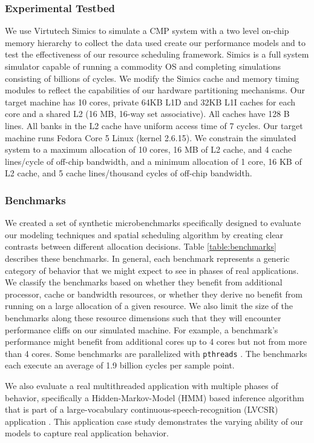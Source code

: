 \subsubsection*{Experimental Testbed}
We use Virtutech Simics \cite{simics} to simulate a CMP system with a two level on-chip memory hierarchy to collect the data used create our performance models and to test the effectiveness of our resource scheduling framework.  Simics is a full system simulator capable of running a commodity OS and completing simulations consisting of billions of cycles. We modify the Simics cache and memory timing modules to reflect the capabilities of our hardware partitioning mechanisms.  Our target machine has 10 cores, private 64KB L1D and 32KB L1I caches for each core and a shared L2 (16 MB, 16-way set associative).  All caches have 128 B lines.   All banks in the L2 cache have uniform access time of 7 cycles.  Our target machine runs Fedora Core 5 Linux (kernel 2.6.15). We constrain the simulated system to a maximum allocation of 10 cores, 16 MB of L2 cache, and 4 cache lines/cycle of off-chip bandwidth, and a minimum allocation of 1 core, 16 KB of L2 cache, and 5 cache lines/thousand cycles of off-chip bandwidth. 

\subsubsection*{Benchmarks}
We created a set of synthetic microbenchmarks specifically designed to evaluate our modeling techniques and spatial scheduling algorithm by creating clear contrasts between different allocation decisions.  Table \ref{table:benchmarks} describes these benchmarks.  In general, each benchmark represents a generic category of behavior that we might expect to see in phases of real applications.  We classify the benchmarks based on whether they benefit from additional processor, cache or bandwidth resources, or whether they derive no benefit from running on a large allocation of a given resource.  We also limit the size of the benchmarks along these resource dimensions such that they will encounter performance cliffs on our simulated machine.  For example, a benchmark's performance might benefit from additional cores up to 4 cores but not from more than 4 cores.   Some benchmarks are parallelized with {\tt pthreads} \cite{pthreads}.  The benchmarks each execute an average of 1.9 billion cycles per sample point.

We also evaluate a real multithreaded application with multiple phases of behavior, specifically 
a Hidden-Markov-Model (HMM) based inference algorithm that is part of a large-vocabulary continuous-speech-recognition (LVCSR) application \cite{chong-eama08, huang-speech}. This application case study demonstrates the varying ability of our models to capture real application behavior.

